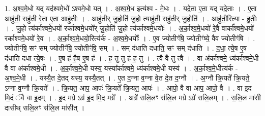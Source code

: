\documentclass[17pt]{extarticle}
\begin{document}
1. अ॒श्व॒मे॒धो यद् यद॑श्वमे॒धो᳚ ऽश्वमे॒धो यत् । . अ॒श्व॒मे॒ध इत्य॑श्व - मे॒धः । . यदे॒ता ए॒ता यद् यदे॒ताः । . ए॒ता आहु॑ती॒ राहु॑ती रे॒ता ए॒ता आहु॑तीः । . आहु॑तीर् जु॒होति॑ जु॒हो त्याहु॑ती॒ राहु॑तीर् जु॒होति॑ । . आहु॑ती॒रित्या - हु॒तीः॒ । . जु॒हो त्य॑र्काश्वमे॒धयो॑ रर्काश्वमे॒धयो᳚र् जु॒होति॑ जु॒हो त्य॑र्काश्वमे॒धयोः᳚ । . अ॒र्का॒श्व॒मे॒धयो॑ रे॒वै वार्का᳚श्वमे॒धयो॑ रर्काश्वमे॒धयो॑ रे॒व । . अ॒र्का॒श्व॒मे॒धयो॒रित्य॑र्क - अ॒श्व॒मे॒धयोः᳚ । . ए॒व ज्योतीꣳ॑षि॒ ज्योतीꣳ॑ष्ये॒ वैव ज्योतीꣳ॑षि । . ज्योतीꣳ॑षि॒ सꣳ सम् ज्योतीꣳ॑षि॒ ज्योतीꣳ॑षि॒ सम् । . सम् द॑धाति दधाति॒ सꣳ सम् द॑धाति । . द॒धा॒ त्ये॒ष ए॒ष द॑धाति दधा त्ये॒षः । . ए॒ष ह॑ है॒ष ए॒ष ह॑ । . ह॒ तु तु ह॑ ह॒ तु । . त्वै वै तु त्वै । . वा अ॑र्काश्वमे॒ ध्य॑र्काश्वमे॒धी वै वा अ॑र्काश्वमे॒धी । . अ॒र्का॒श्व॒मे॒धी यस्य॒ यस्या᳚र्काश्वमे॒ ध्य॑र्काश्वमे॒धी यस्य॑ । . अ॒र्का॒श्व॒मे॒धीत्य॑र्क - अ॒श्व॒मे॒धी । . यस्यै॒त दे॒तद् यस्य॒ यस्यै॒तत् । . ए॒त द॒ग्ना व॒ग्ना वे॒त दे॒त द॒ग्नौ । . अ॒ग्नौ क्रि॒यते᳚ क्रि॒यते॒ ऽग्ना व॒ग्नौ क्रि॒यते᳚ । . क्रि॒यत॒ आप॒ आपः॑ क्रि॒यते᳚ क्रि॒यत॒ आपः॑ । . आपो॒ वै वा आप॒ आपो॒ वै । . वा इ॒द मि॒दं ॅवै वा इ॒दम् । . इ॒द मग्रे ऽग्र॑ इ॒द मि॒द मग्रे᳚ । . अग्रे॑ सलि॒लꣳ स॑लि॒ल मग्रे ऽग्रे॑ सलि॒लम् । . स॒लि॒ल मा॑सी दासीथ् सलि॒लꣳ स॑लि॒ल मा॑सीत् । \newline
\end{document}
